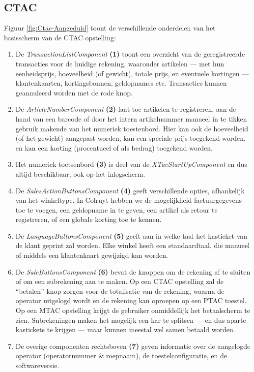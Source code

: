 \subsection{CTAC}

Figuur \ref{fig:Ctac-Aangeduid} toont de verschillende onderdelen van het basisscherm van de CTAC opstelling:

\begin{enumerate}
    \item De \emph{TransactionListComponent} \textbf{(1)} toont een overzicht van de geregistreerde transacties voor de huidige rekening, waaronder artikelen — met hun eenheidsprijs, hoeveelheid (of gewicht), totale prijs, en eventuele kortingen — klantenkaarten, kortingsbonnen, geldopnames etc. Transacties kunnen geannuleerd worden met de rode knop.
    \item De \emph{ArticleNumberComponent} \textbf{(2)} laat toe artikelen te registreren, aan de hand van een barcode of door het intern artikelnummer manueel in te tikken gebruik makende van het numeriek toestenbord. Hier kan ook de hoeveelheid (of het gewicht) aangepast worden, kan een speciale prijs toegekend worden, en kan een korting (procentueel of als bedrag) toegekend worden.
    \item Het numeriek toetsenbord \textbf{(3)} is deel van de \emph{XTacStartUpComponent} en dus altijd beschikbaar, ook op het inlogscherm.
    \item De \emph{SalesActionButtonsComponent} \textbf{(4)} geeft verschillende opties, afhankelijk van het winkeltype. In Colruyt hebben we de mogelijkheid factuurgegevens toe te voegen, een geldopname in te geven, een artikel als retour te registreren, of een globale korting toe te kennen.
    \item De \emph{LanguageButtonsComponent} \textbf{(5)} geeft aan in welke taal het kasticket van de klant geprint zal worden. Elke winkel heeft een standaardtaal, die manueel of middels een klantenkaart gewijzigd kan worden.
    \item De \emph{SaleButtonsComponent} \textbf{(6)} bevat de knoppen om de rekening af te sluiten of om een subrekening aan te maken. Op een CTAC opstelling zal de ``betalen'' knop zorgen voor de totalisatie van de rekening, waarna de operator uitgelogd wordt en de rekening kan oproepen op een PTAC toestel. Op een MTAC opstelling krijgt de gebruiker onmiddellijk het betaalscherm te zien. Subrekeningen maken het mogelijk een kar te splitsen — en dus aparte kastickets te krijgen — maar kunnen meestal wel samen betaald worden.
    \item De overige componenten rechtsboven \textbf{(7)} geven informatie over de aangelogde operator (operatornummer \& roepnaam), de toestelconfiguratie, en de softwareversie.
\end{enumerate}


